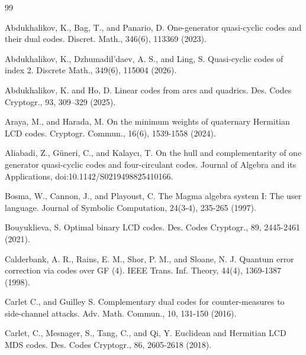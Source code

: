 \documentclass[a4paper,12pt]{article}
\begin{document}
\begin{thebibliography}{99} 

Abdukhalikov, K., Bag, T., and Panario, D.  One-generator quasi-cyclic codes and their dual codes. Discret. Math., 346(6), 113369 (2023).


Abdukhalikov, K., Dzhumadil'daev, A. S., and Ling, S. 
Quasi-cyclic codes of index 2. Discrete Math., 349(6), 115004 (2026).

 

Abdukhalikov, K. and Ho, D. Linear codes from arcs and quadrics. 
Des. Codes Cryptogr., 93, 309–329 (2025). 



Araya, M., and Harada, M.  On the minimum weights of quaternary Hermitian LCD codes. 
Cryptogr. Commun., 16(6), 1539-1558  (2024).




Aliabadi, Z., G\"uneri, C., and Kalaycı, T.  On the hull and complementarity of one generator quasi-cyclic codes and four-circulant codes. Journal of Algebra and its Applications, doi:10.1142/S0219498825410166. 

Bosma, W., Cannon, J., and Playoust, C. The Magma algebra system I: The user language. Journal of Symbolic Computation, 24(3-4), 235-265   (1997). 

Bouyuklieva, S. Optimal binary LCD codes. 
Des. Codes Cryptogr., 89, 2445-2461 (2021).

Calderbank, A. R., Rains, E. M., Shor, P. M., and Sloane, N. J. Quantum error correction via codes over GF (4).
IEEE Trans. Inf. Theory, 44(4), 1369-1387 (1998). 






 Carlet C., and Guilley S. Complementary dual codes for counter-measures to side-channel attacks. 
Adv. Math. Commun., 10, 131-150 (2016).

Carlet, C., Mesnager, S., Tang, C., and  Qi, Y. Euclidean and Hermitian LCD MDS codes. 
Des. Codes Cryptogr., 86, 2605-2618  (2018).



\end{thebibliography}
\end{document}
